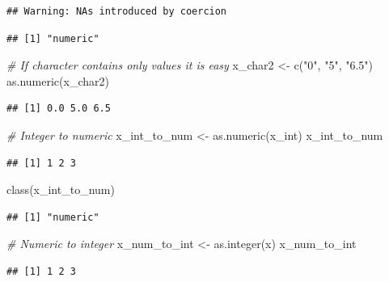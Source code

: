 \documentclass[
]{book}
\newenvironment{Shaded}{\begin{snugshade}}{\end{snugshade}}
\newcommand{\CommentTok}[1]{\textcolor[rgb]{0.56,0.35,0.01}{\textit{#1}}}
\newcommand{\FunctionTok}[1]{\textcolor[rgb]{0.00,0.00,0.00}{#1}}
\newcommand{\NormalTok}[1]{#1}
\newcommand{\OtherTok}[1]{\textcolor[rgb]{0.56,0.35,0.01}{#1}}
\newcommand{\StringTok}[1]{\textcolor[rgb]{0.31,0.60,0.02}{#1}}
\begin{document}
\begin{verbatim}
## Warning: NAs introduced by coercion
\end{verbatim}

\begin{verbatim}
## [1] "numeric"
\end{verbatim}

\begin{Shaded}
\begin{Highlighting}[]
\CommentTok{\# If character contains only values it is easy}
\NormalTok{x\_char2 }\OtherTok{\textless{}{-}} \FunctionTok{c}\NormalTok{(}\StringTok{"0"}\NormalTok{, }\StringTok{"5"}\NormalTok{, }\StringTok{"6.5"}\NormalTok{)}
\FunctionTok{as.numeric}\NormalTok{(x\_char2)}
\end{Highlighting}
\end{Shaded}

\begin{verbatim}
## [1] 0.0 5.0 6.5
\end{verbatim}

\begin{Shaded}
\begin{Highlighting}[]
\CommentTok{\# Integer to numeric}
\NormalTok{x\_int\_to\_num }\OtherTok{\textless{}{-}} \FunctionTok{as.numeric}\NormalTok{(x\_int)}
\NormalTok{x\_int\_to\_num}
\end{Highlighting}
\end{Shaded}

\begin{verbatim}
## [1] 1 2 3
\end{verbatim}

\begin{Shaded}
\begin{Highlighting}[]
\FunctionTok{class}\NormalTok{(x\_int\_to\_num)}
\end{Highlighting}
\end{Shaded}

\begin{verbatim}
## [1] "numeric"
\end{verbatim}

\begin{Shaded}
\begin{Highlighting}[]
\CommentTok{\# Numeric to integer}
\NormalTok{x\_num\_to\_int }\OtherTok{\textless{}{-}} \FunctionTok{as.integer}\NormalTok{(x)}
\NormalTok{x\_num\_to\_int}
\end{Highlighting}
\end{Shaded}

\begin{verbatim}
## [1] 1 2 3
\end{verbatim}
\end{document}
